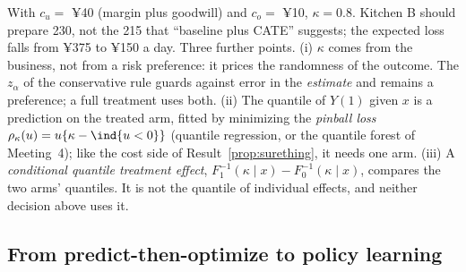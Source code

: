 \documentclass[11pt]{article}
\begin{document}
With $c_u = $ ¥40 (margin plus goodwill) and $c_o = $ ¥10, $\kappa = 0.8$. Kitchen B should prepare 230, not the 215 that
``baseline plus CATE'' suggests; the expected loss falls from ¥375 to ¥150 a day. Three further points. (i) $\kappa$ comes from the
business, not from a risk preference: it prices the randomness of the outcome. The $z_\alpha$ of the conservative rule
guards against error in the \emph{estimate} and remains a preference; a full treatment uses both. (ii) The quantile of
$Y(1)$ given $x$ is a prediction on the treated arm, fitted by minimizing the \emph{pinball loss}
$\rho_\kappa(u) = u\{\kappa - \ind{u < 0}\}$ (quantile regression, or the quantile forest of Meeting~4); like the cost side of
Result~\ref{prop:surething}, it needs one arm. (iii) A \emph{conditional quantile treatment effect},
$F_1^{-1}(\kappa \mid x) - F_0^{-1}(\kappa \mid x)$, compares the two arms' quantiles. It is not the quantile of individual effects,
and neither decision above uses it.

\subsection{From predict-then-optimize to policy learning}
\end{document}
